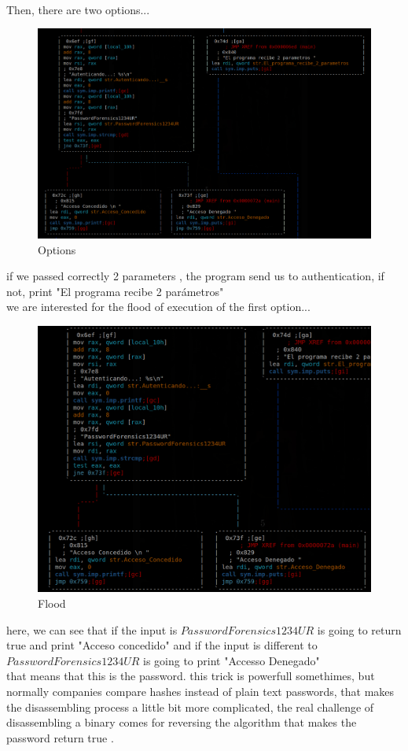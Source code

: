 \documentclass[10pt,a4paper]{article} %
\begin{document}
            \\ Then, there are two options...
            \begin{figure}[h!]
                \centering
                \includegraphics[width=0.8\linewidth]{options.png}
                \caption{Options}
                \label{fig:options}
            \end{figure}
            \newpage
            if we passed correctly 2 parameters , the program send us to
            authentication, if not, print "El programa recibe 2 parámetros"
            \\ we are interested for the flood of execution of the first option...
            \begin{figure}[h!]
                \centering
                \includegraphics[width=0.7\linewidth]{floodi.png}
                \caption{Flood}
                \label{floodi}
            \end{figure}
            here, we can see that if the input is $ PasswordForensics1234UR   $ is
            going to return true and print "Acceso concedido" and if the input
            is different to $ PasswordForensics1234UR$ is going to print
            "Accesso Denegado"
            \\ that means that this is the password. this trick is powerfull
            somethimes, but normally companies compare hashes instead of plain
            text passwords, that makes the disassembling process a little bit
            more complicated, the real challenge of disassembling a binary
            comes for reversing the algorithm that makes the password return
            true .
\end{document}
